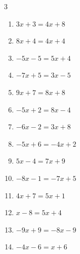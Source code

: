 \begin{multicols}{3}
\begin{enumerate}
  \item $3x+3=4x+8$

        \phantom{$\displaystyle x=-5$}

  \item $8x+4=4x+4$

        \phantom{$\displaystyle x=0$}

\columnbreak %

  \item $-5x-5=5x+4$


  \item $-7x+5=3x-5$

        \phantom{$\displaystyle x=1$}

  \item $9x+7=8x+8$

        \phantom{$\displaystyle x=1$}

  \item $-5x+2=8x-4$


  \item $-6x-2=3x+8$


  \item $-5x+6=-4x+2$

        \phantom{$\displaystyle x=4$}

  \item $5x-4=7x+9$


  \item $-8x-1=-7x+5$

        \phantom{$\displaystyle x=-6$}

  \item $4x+7=5x+1$

        \phantom{$\displaystyle x=6$}

  \item $x-8=5x+4$

        \phantom{$\displaystyle x=-3$}

  \item $-9x+9=-8x-9$

        \phantom{$\displaystyle x=18$}

  \item $-4x-6=x+6$



\end{enumerate}
\end{multicols}
